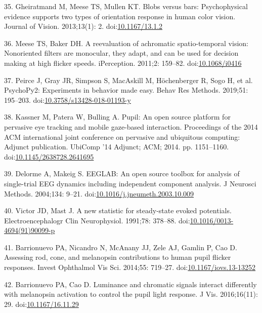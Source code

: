 \documentclass[
]{article}
\begin{document}
\leavevmode\hypertarget{ref-Gheiratmand2013}{}%
35. Gheiratmand M, Meese TS, Mullen KT. Blobs versus bars: Psychophysical evidence supports two types of orientation response in human color vision. Journal of Vision. 2013;13(1): 2. doi:\href{https://doi.org/10.1167/13.1.2}{10.1167/13.1.2}

\leavevmode\hypertarget{ref-Meese2011}{}%
36. Meese TS, Baker DH. A reevaluation of achromatic spatio-temporal vision: Nonoriented filters are monocular, they adapt, and can be used for decision making at high flicker speeds. iPerception. 2011;2: 159--82. doi:\href{https://doi.org/10.1068/i0416}{10.1068/i0416}

\leavevmode\hypertarget{ref-Peirce2019}{}%
37. Peirce J, Gray JR, Simpson S, MacAskill M, Höchenberger R, Sogo H, et al. PsychoPy2: Experiments in behavior made easy. Behav Res Methods. 2019;51: 195--203. doi:\href{https://doi.org/10.3758/s13428-018-01193-y}{10.3758/s13428-018-01193-y}

\leavevmode\hypertarget{ref-Kassner2014}{}%
38. Kassner M, Patera W, Bulling A. Pupil: An open source platform for pervasive eye tracking and mobile gaze-based interaction. Proceedings of the 2014 ACM international joint conference on pervasive and ubiquitous computing: Adjunct publication. UbiComp '14 Adjunct; ACM; 2014. pp. 1151--1160. doi:\href{https://doi.org/10.1145/2638728.2641695}{10.1145/2638728.2641695}

\leavevmode\hypertarget{ref-Delorme2004}{}%
39. Delorme A, Makeig S. EEGLAB: An open source toolbox for analysis of single-trial EEG dynamics including independent component analysis. J Neurosci Methods. 2004;134: 9--21. doi:\href{https://doi.org/10.1016/j.jneumeth.2003.10.009}{10.1016/j.jneumeth.2003.10.009}

\leavevmode\hypertarget{ref-Victor1991}{}%
40. Victor JD, Mast J. A new statistic for steady-state evoked potentials. Electroencephalogr Clin Neurophysiol. 1991;78: 378--88. doi:\href{https://doi.org/10.1016/0013-4694(91)90099-p}{10.1016/0013-4694(91)90099-p}

\leavevmode\hypertarget{ref-Barrionuevo2014}{}%
41. Barrionuevo PA, Nicandro N, McAnany JJ, Zele AJ, Gamlin P, Cao D. Assessing rod, cone, and melanopsin contributions to human pupil flicker responses. Invest Ophthalmol Vis Sci. 2014;55: 719--27. doi:\href{https://doi.org/10.1167/iovs.13-13252}{10.1167/iovs.13-13252}

\leavevmode\hypertarget{ref-Barrionuevo2016}{}%
42. Barrionuevo PA, Cao D. Luminance and chromatic signals interact differently with melanopsin activation to control the pupil light response. J Vis. 2016;16(11): 29. doi:\href{https://doi.org/10.1167/16.11.29}{10.1167/16.11.29}
\end{document}
